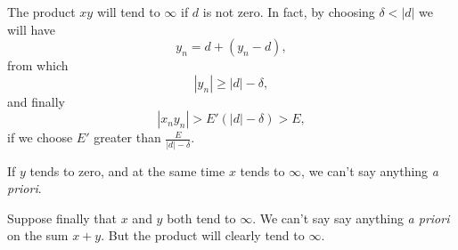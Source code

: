 \documentclass[10pt,letterpaper]{book}
\theoremstyle{definition}
\begin{document}

The product $xy$ will tend to $\infty$ if $d$ is not zero. In fact, by choosing $\delta < |d|$ we will have
\[
  y_n = d + (y_n - d),
\]
from which
\[
  |y_n|\geq |d| - \delta,
\]
and finally
\[
  |x_ny_n| > E'(|d|-\delta) > E,
\]
if we choose $E'$ greater than $\frac{E}{|d|-\delta}$.

If $y$ tends to zero, and at the same time $x$ tends to $\infty$, we can't say anything \textit{a priori}.

Suppose finally that $x$ and $y$ both tend to $\infty$. We can't say say anything \textit{a priori} on the sum $x+y$. But the product will clearly tend to $\infty$.

\begin{thebibliography}{9}

\end{thebibliography}
\end{document}
